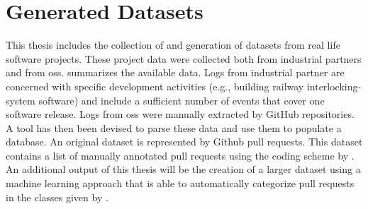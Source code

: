 %	
%	


\section{Generated Datasets}
\label{sec:data-collection}


This thesis includes the collection of and generation of datasets from real life software projects. These project data were collected both from industrial partners and from \gls{oss}.  summarizes the available data. Logs from industrial partner are concerned with specific development activities (e.g., building railway interlocking-system software) and include a sufficient number of events that cover one software release. Logs from \gls{oss} were manually extracted by GitHub repositories. A tool has then been devised to parse these data and use them to populate a database. An original dataset is represented by Github pull requests. This dataset contains a list of manually annotated pull requests using the coding scheme by \cite[]{Majchrzak2016}. An additional output of this thesis will be the creation of a larger dataset using a machine learning approach that is able to automatically categorize pull requests in the classes given by \cite[]{Majchrzak2016}.



